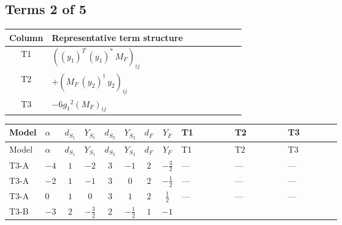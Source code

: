 \documentclass[8pt]{article}
\begin{document}
\begin{landscape}
\subsection*{Terms 2 of 5}
\begin{center}
\begin{tabular}{@{}c >{\raggedright\arraybackslash}p{0.82\linewidth}@{}}
\toprule
Column & Representative term structure \\
\midrule
T1 & \(\displaystyle \left(\left({y_1}\right)^{T}\,\left({y_1}\right)^{*}\,{M_F}\right)_{ij}\) \\
\midrule
T2 & \(\displaystyle +\left({M_F}\,\left({y_2}\right)^{\dagger}\,{y_2}\right)_{ij}\) \\
\midrule
T3 & \(\displaystyle -6 {g_1}^2 \left({M_F}\right)_{ij}\) \\
\midrule
\bottomrule
\end{tabular}
\end{center}
\smallskip
\tiny
\begin{longtable}{@{}llcccccc >{\raggedright\arraybackslash}p{0.21\linewidth} >{\raggedright\arraybackslash}p{0.21\linewidth} >{\raggedright\arraybackslash}p{0.21\linewidth}@{}}
\toprule
Model & $\alpha$ & $d_{S_1}$ & $Y_{S_1}$ & $d_{S_2}$ & $Y_{S_2}$ & $d_F$ & $Y_F$ & T1 & T2 & T3 \\
\midrule
\endfirsthead
\toprule
Model & $\alpha$ & $d_{S_1}$ & $Y_{S_1}$ & $d_{S_2}$ & $Y_{S_2}$ & $d_F$ & $Y_F$ & T1 & T2 & T3 \\
\midrule
\endhead
T3-A & $-4$ & $1$ & $-2$ & $3$ & $-1$ & $2$ & $-\frac{3}{2}$ & --- & --- & --- \\
\midrule
T3-A & $-2$ & $1$ & $-1$ & $3$ & $0$ & $2$ & $-\frac{1}{2}$ & --- & --- & --- \\
\midrule
T3-A & $0$ & $1$ & $0$ & $3$ & $1$ & $2$ & $\frac{1}{2}$ & --- & --- & --- \\
\midrule
T3-B & $-3$ & $2$ & $-\frac{3}{2}$ & $2$ & $-\frac{1}{2}$ & $1$ & $-1$ & \scriptsize\adjustbox{max width=\linewidth}{$\begin{gathered} \left(\left({y_1}\right)^{T}\,\left({y_1}\right)^{*}\,{M_F}\right)_{ij}\end{gathered}$} & \scriptsize\adjustbox{max width=\linewidth}{$\begin{gathered} +\left({M_F}\,\left({y_2}\right)^{\dagger}\,{y_2}\right)_{ij}\end{gathered}$} & \scriptsize\adjustbox{max width=\linewidth}{$\begin{gathered} -6 {g_1}^2 \left({M_F}\right)_{ij}\end{gathered}$} \\

\end{longtable}
\end{landscape}
\end{document}
